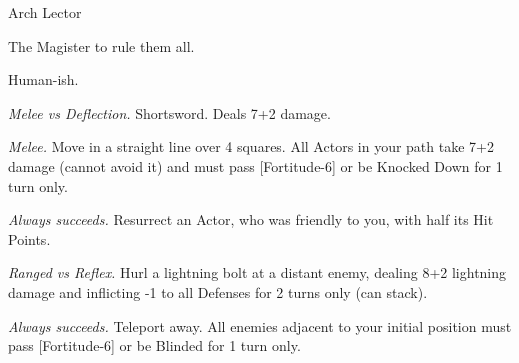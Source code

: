 \begin{monsterboxbg}{Arch Lector}

    The Magister to rule them all.
    
    \rpghline
    \stats[
        STR = \stat{14}, 
        DEX = \stat{16},
        CON = \stat{22},
        INT = \stat{30},
        WIS = \stat{22},
        CHA = \stat{24},
    ]
    \rpghline

    \basics[
    armorclass = 2,
    hitpoints  = 220,
    focus      = 15,
    defenses   = {Deflection 10, Reflex 10, Fortitude 13, Will 17}
    ]
    \rpghline

    \details[%
    skills = {Kosmics 10, Psychology 2, Lore 5, Athletics 3},
    accuracies = {Melee 6, Ranged 12},
    challenge = Nightmare Boss,
    ]
    \rpghline%
    \begin{rpg-monsteraction}
        Human-ish.
    \end{rpg-monsteraction}

    

    \begin{rpg-monsteraction}
        \textit{Melee vs Deflection.} Shortsword. Deals 7+2 damage.
    \end{rpg-monsteraction}

    \begin{rpg-monsteraction}[Lunge]
        \textit{Melee.} Move in a straight line over 4 squares. All Actors in your path take 7+2 damage (cannot avoid it) and must pass [Fortitude-6] or be Knocked Down for 1 turn only.
    \end{rpg-monsteraction}

    \begin{rpg-monsteraction}
        \textit{Always succeeds.} Resurrect an Actor, who was friendly to you, with half its Hit Points.
    \end{rpg-monsteraction}

    \begin{rpg-monsteraction}[Vainquish]
        \textit{Ranged vs Reflex.} Hurl a lightning bolt at a distant enemy, dealing 8+2 lightning damage and inflicting -1 to all Defenses for 2 turns only (can stack).
    \end{rpg-monsteraction}

    \begin{rpg-monsteraction}[Blink]
        \textit{Always succeeds.} Teleport away. All enemies adjacent to your initial position must pass [Fortitude-6] or be Blinded for 1 turn only.
    \end{rpg-monsteraction}


\end{monsterboxbg}
